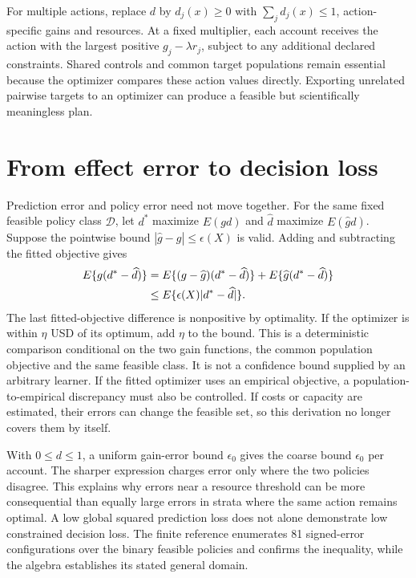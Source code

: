 For multiple actions, replace $d$ by $d_j(x)\geq0$ with
$\sum_jd_j(x)\leq1$, action-specific gains and resources. At a fixed
multiplier, each account receives the action with the largest positive
$g_j-\lambda r_j$, subject to any additional declared constraints. Shared
controls and common target populations remain essential because the optimizer
compares these action values directly. Exporting unrelated pairwise targets
to an optimizer can produce a feasible but scientifically meaningless plan.

\section{From effect error to decision loss}
\label{exec17:s4-regret}

Prediction error and policy error need not move together. For the same fixed
feasible policy class $\mathcal D$, let $d^*$ maximize $E(gd)$ and
$\widehat d$ maximize $E(\widehat g d)$. Suppose the pointwise bound
$|\widehat g-g|\leq\epsilon(X)$ is valid. Adding and subtracting the fitted
objective gives
\begin{align}
 E\{g(d^*-\widehat d)\}
 &=E\{(g-\widehat g)(d^*-\widehat d)\}
       +E\{\widehat g(d^*-\widehat d)\}\notag\\
 &\leq E\{\epsilon(X)|d^*-\widehat d|\}.
 \label{exec17:s4-regret-bound}
\end{align}
The last fitted-objective difference is nonpositive by optimality. If the
optimizer is within $\eta$ USD of its optimum, add $\eta$ to the bound.
This is a deterministic comparison conditional on the two gain functions,
the common population objective and the same feasible class. It is not a
confidence bound supplied by an arbitrary learner. If the fitted optimizer
uses an empirical objective, a population-to-empirical discrepancy must also
be controlled. If costs or capacity are estimated, their errors can change
the feasible set, so this derivation no longer covers them by itself.

With $0\leq d\leq1$, a uniform gain-error bound $\epsilon_0$ gives the coarse
bound $\epsilon_0$ per account. The sharper expression charges error only
where the two policies disagree. This explains why errors near a resource
threshold can be more consequential than equally large errors in strata
where the same action remains optimal. A low global squared prediction loss
does not alone demonstrate low constrained decision loss. The finite
reference enumerates 81 signed-error configurations over the binary feasible
policies and confirms the inequality, while the algebra establishes its stated
general domain.~\citep{exec17_s4_math}

